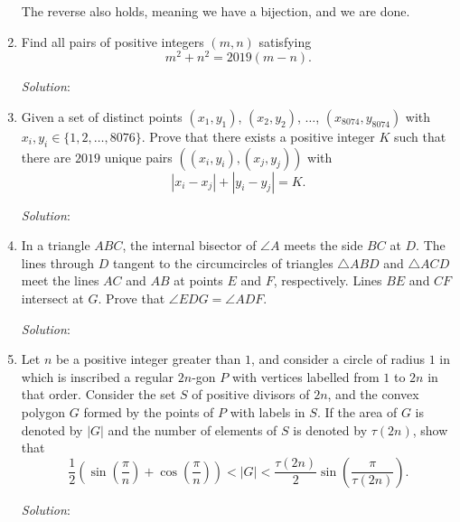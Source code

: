 \documentclass{article}
\begin{document}
\begin{enumerate}[1.]
  The reverse also holds, meaning we have a bijection, and we are done.
  
\vfill

\item %
Find all pairs of positive integers $(m,n)$ satisfying
\[ m^2 +n^2 = 2019(m-n). \]

\textit{Solution}:
\vfill

\item %
Given a set of distinct points $(x_1, y_1)$, $(x_2, y_2)$, $\dots$, $(x_{8074}, y_{8074})$ with $x_i, y_i \in \{1, 2, \dots, 8076\}$.
Prove that there exists a positive integer $K$ such that there are $2019$ unique pairs $( (x_i, y_i), (x_j, y_j) )$ with
\[ |x_i - x_j| + |y_i - y_j| = K. \]

\textit{Solution}:
\vfill

\item %
In a triangle $ABC$, the internal bisector of $\angle A$ meets the side $BC$ at $D$.
The lines through $D$ tangent to the circumcircles of triangles $\triangle ABD$ and $\triangle ACD$ meet the lines $AC$ and $AB$ at points $E$ and $F$, respectively.
Lines $BE$ and $CF$ intersect at $G$.
Prove that $\angle EDG = \angle ADF$.

\textit{Solution}:
\vfill

\item %
\newcommand{\parens}[1]{\left(#1\right)}
Let $n$ be a positive integer greater than $1$, and consider a circle of radius $1$ in which is inscribed a regular $2n$-gon $P$ with vertices labelled from $1$ to $2n$ in that order.
Consider the set $S$ of positive divisors of $2n$, and the convex polygon $G$ formed by the points of $P$ with labels in $S$.
If the area of $G$ is denoted by $|G|$ and the number of elements of $S$ is denoted by $\tau(2n)$, show that
\[ \frac{1}{2} \parens{\sin\parens{\frac{\pi}{n}} +\cos\parens{\frac{\pi}{n}}} < |G| < \frac{\tau(2n)}{2} \sin\parens{\frac{\pi}{\tau(2n)}}. \]

\textit{Solution}:
\vfill


\end{enumerate}
\end{document}
